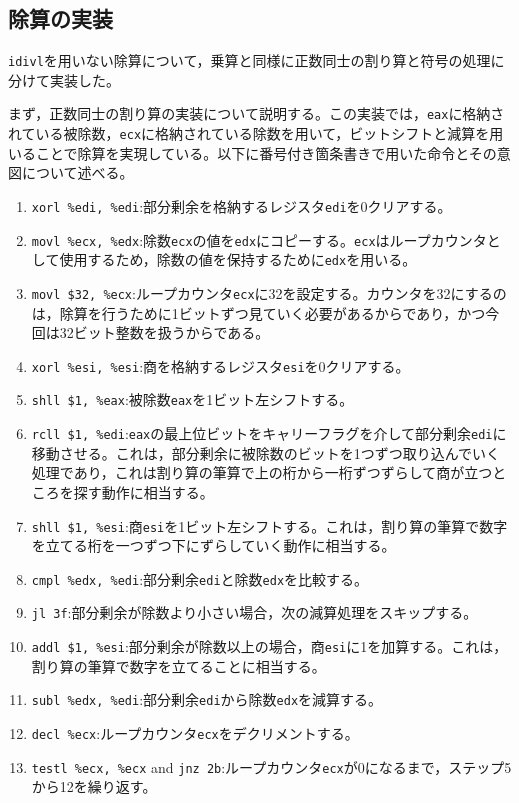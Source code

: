 \documentclass[a4paper]{jsarticle}
\newcommand{\var}[1]{\texttt{#1}}
\begin{document}
\subsection{除算の実装}

\var{idivl}を用いない除算について，乗算と同様に正数同士の割り算と符号の処理に分けて実装した。

まず，正数同士の割り算の実装について説明する。この実装では，\var{eax}に格納されている被除数，\var{ecx}に格納されている除数を用いて，ビットシフトと減算を用いることで除算を実現している。以下に番号付き箇条書きで用いた命令とその意図について述べる。

\begin{enumerate}
\item \var{xorl \%edi, \%edi}:部分剰余を格納するレジスタ\var{edi}を0クリアする。
\item \var{movl \%ecx, \%edx}:除数\var{ecx}の値を\var{edx}にコピーする。\var{ecx}はループカウンタとして使用するため，除数の値を保持するために\var{edx}を用いる。
\item \var{movl \$32, \%ecx}:ループカウンタ\var{ecx}に32を設定する。カウンタを32にするのは，除算を行うために1ビットずつ見ていく必要があるからであり，かつ今回は32ビット整数を扱うからである。
\item \var{xorl \%esi, \%esi}:商を格納するレジスタ\var{esi}を0クリアする。
\item \var{shll \$1, \%eax}:被除数\var{eax}を1ビット左シフトする。
\item \var{rcll \$1, \%edi}:\var{eax}の最上位ビットをキャリーフラグを介して部分剰余\var{edi}に移動させる。これは，部分剰余に被除数のビットを1つずつ取り込んでいく処理であり，これは割り算の筆算で上の桁から一桁ずつずらして商が立つところを探す動作に相当する。
\item \var{shll \$1, \%esi}:商\var{esi}を1ビット左シフトする。これは，割り算の筆算で数字を立てる桁を一つずつ下にずらしていく動作に相当する。
\item \var{cmpl \%edx, \%edi}:部分剰余\var{edi}と除数\var{edx}を比較する。
\item \var{jl 3f}:部分剰余が除数より小さい場合，次の減算処理をスキップする。
\item \var{addl \$1, \%esi}:部分剰余が除数以上の場合，商\var{esi}に1を加算する。これは，割り算の筆算で数字を立てることに相当する。
\item \var{subl \%edx, \%edi}:部分剰余\var{edi}から除数\var{edx}を減算する。
\item \var{decl \%ecx}:ループカウンタ\var{ecx}をデクリメントする。
\item \var{testl \%ecx, \%ecx} and \var{jnz 2b}:ループカウンタ\var{ecx}が0になるまで，ステップ5から12を繰り返す。
\end{enumerate}
\end{document}
